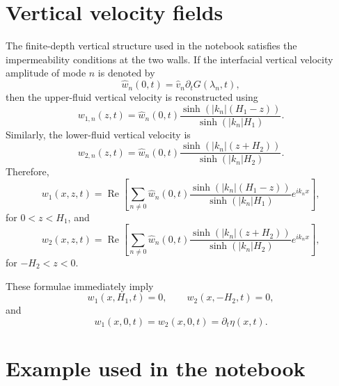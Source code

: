 \documentclass[11pt,a4paper]{article}
\begin{document}
\section{Vertical velocity fields}

The finite-depth vertical structure used in the notebook satisfies the impermeability conditions at the two walls.  If the interfacial vertical velocity amplitude of mode $n$ is denoted by
\begin{equation}
    \widehat{w}_n(0,t)
    =
    \widehat{v}_n\partial_tG(\lambda_n,t),
\end{equation}
then the upper-fluid vertical velocity is reconstructed using
\begin{equation}
    w_{1,n}(z,t)
    =
    \widehat{w}_n(0,t)
    \frac{\sinh\left(|k_n|(H_1-z)\right)}{\sinh\left(|k_n|H_1\right)}.
    \label{eq:upper_vertical_shape}
\end{equation}
Similarly, the lower-fluid vertical velocity is
\begin{equation}
    w_{2,n}(z,t)
    =
    \widehat{w}_n(0,t)
    \frac{\sinh\left(|k_n|(z+H_2)\right)}{\sinh\left(|k_n|H_2\right)}.
    \label{eq:lower_vertical_shape}
\end{equation}
Therefore,
\begin{equation}
    w_1(x,z,t)
    =
    \operatorname{Re}
    \left[
    \sum_{n\neq 0}
    \widehat{w}_n(0,t)
    \frac{\sinh\left(|k_n|(H_1-z)\right)}{\sinh\left(|k_n|H_1\right)}
    e^{ik_nx}
    \right],
    \label{eq:w1_reconstruction}
\end{equation}
for $0<z<H_1$, and
\begin{equation}
    w_2(x,z,t)
    =
    \operatorname{Re}
    \left[
    \sum_{n\neq 0}
    \widehat{w}_n(0,t)
    \frac{\sinh\left(|k_n|(z+H_2)\right)}{\sinh\left(|k_n|H_2\right)}
    e^{ik_nx}
    \right],
    \label{eq:w2_reconstruction}
\end{equation}
for $-H_2<z<0$.

These formulae immediately imply
\begin{equation}
    w_1(x,H_1,t)=0,
    \qquad
    w_2(x,-H_2,t)=0,
\end{equation}
and
\begin{equation}
    w_1(x,0,t)=w_2(x,0,t)=\partial_t\eta(x,t).
\end{equation}

\section{Example used in the notebook}
\end{document}
